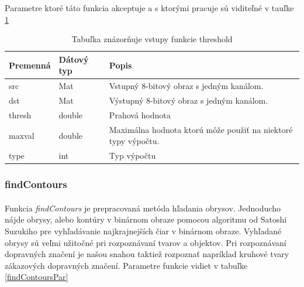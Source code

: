 \documentclass[12pt]{article}
\begin{document}
Parametre ktoré táto funkcia akceptuje a s ktorými pracuje sú viditeľné v tauľke \ref{thresholdPar}
\cite{OpenCVDoc}
\begin{table}
	\centering
    \begin{tabular}{ | l | l | p{5cm} |}
    \hline
    Premenná & Dátový typ & Popis \\ \hline
    src & Mat & Vstupný 8-bitový obraz s jedným kanálom. \\ \hline
    dst & Mat & Výstupný 8-bitový obraz s jedným kanálom. \\ \hline
    thresh & double & Prahová hodnota \\ \hline
    maxval & double & Maximálna hodnota ktorú môže použiť na niektoré typy výpočtu. \\ \hline
    type & int & Typ výpočtu \\
    \hline
    \end{tabular}
  	\caption{Tabuľka znázorňuje vstupy funkcie threshold}
  	\label{thresholdPar}
\end{table}
\subsubsection{findContours}
\paragraph{}
Funkcia \emph{findContours} je prepracovaná metóda hľadania obrysov. Jednoducho nájde obrysy, alebo kontúry v binárnom obraze pomocou algoritmu od Satoshi Suzukiho pre vyhľadávanie najkrajnejších čiar v binárnom obraze.
Vyhľadané obrysy sú veľmi užitočné pri rozpoznávaní tvarov a objektov. Pri rozpoznávaní dopravných značení je našou snahou taktiež rozpoznať napríklad kruhové tvary zákazových dopravných značení. Parametre funkcie vidiet v tabuľke \ref{findContoursPar}
\cite{OpenCVDoc}
\end{document}
